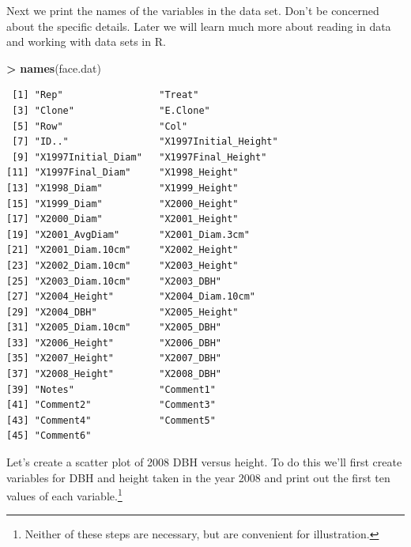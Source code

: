 \documentclass[]{krantz}
\makeatletter
\newenvironment{Shaded}{\begin{snugshade}}{\end{snugshade}}
\newcommand{\DecValTok}[1]{\textcolor[rgb]{0.06,0.06,0.06}{#1}}
\newcommand{\KeywordTok}[1]{\textcolor[rgb]{0.27,0.27,0.27}{\textbf{#1}}}
\newcommand{\NormalTok}[1]{#1}
\newcommand{\OperatorTok}[1]{\textcolor[rgb]{0.43,0.43,0.43}{\textbf{#1}}}
\newcommand{\StringTok}[1]{\textcolor[rgb]{0.5,0.5,0.5}{#1}}
\newenvironment{kframe}{%
\medskip{}
\setlength{\fboxsep}{.8em}
 \def\at@end@of@kframe{}%
 \ifinner\ifhmode%
  \def\at@end@of@kframe{\end{minipage}}%
  \begin{minipage}{\columnwidth}%
 \fi\fi%
 \def\FrameCommand##1{\hskip\@totalleftmargin \hskip-\fboxsep
 \colorbox{shadecolor}{##1}\hskip-\fboxsep
     \hskip-\linewidth \hskip-\@totalleftmargin \hskip\columnwidth}%
 \MakeFramed {\advance\hsize-\width
   \@totalleftmargin\z@ \linewidth\hsize
   \@setminipage}}%
 {\par\unskip\endMakeFramed%
 \at@end@of@kframe}
\renewenvironment{Shaded}{\begin{kframe}}{\end{kframe}}
\makeatother
\begin{document}
Next we print the names of the variables in the data set. Don't be concerned about the specific details. Later we will learn much more about reading in data and working with data sets in R.

\begin{Shaded}
\begin{Highlighting}[]
\OperatorTok{>}\StringTok{ }\KeywordTok{names}\NormalTok{(face.dat)}
\end{Highlighting}
\end{Shaded}

\begin{verbatim}
 [1] "Rep"                 "Treat"              
 [3] "Clone"               "E.Clone"            
 [5] "Row"                 "Col"                
 [7] "ID.."                "X1997Initial_Height"
 [9] "X1997Initial_Diam"   "X1997Final_Height"  
[11] "X1997Final_Diam"     "X1998_Height"       
[13] "X1998_Diam"          "X1999_Height"       
[15] "X1999_Diam"          "X2000_Height"       
[17] "X2000_Diam"          "X2001_Height"       
[19] "X2001_AvgDiam"       "X2001_Diam.3cm"     
[21] "X2001_Diam.10cm"     "X2002_Height"       
[23] "X2002_Diam.10cm"     "X2003_Height"       
[25] "X2003_Diam.10cm"     "X2003_DBH"          
[27] "X2004_Height"        "X2004_Diam.10cm"    
[29] "X2004_DBH"           "X2005_Height"       
[31] "X2005_Diam.10cm"     "X2005_DBH"          
[33] "X2006_Height"        "X2006_DBH"          
[35] "X2007_Height"        "X2007_DBH"          
[37] "X2008_Height"        "X2008_DBH"          
[39] "Notes"               "Comment1"           
[41] "Comment2"            "Comment3"           
[43] "Comment4"            "Comment5"           
[45] "Comment6"           
\end{verbatim}

Let's create a scatter plot of 2008 DBH versus height. To do this we'll first create variables for DBH and height taken in the year 2008 and print out the first ten values of each variable.\footnote{Neither of these steps are necessary, but are convenient for illustration.}

\begin{Shaded}
\end{Shaded}
\end{document}
